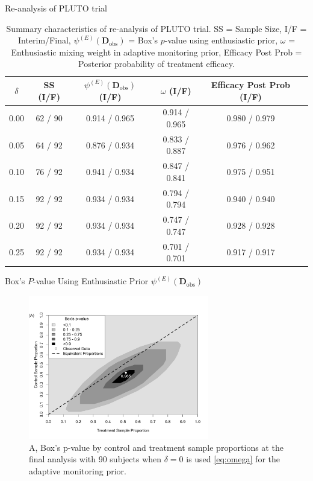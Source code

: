 \documentclass{beamer}
\begin{document}
\begin{frame}{Re-analysis of PLUTO trial}
\footnotesize
\begin{table}[htbp]\label{tbl:real-pluto}%
\centering
\caption{Summary characteristics of re-analysis of PLUTO trial. SS = Sample Size, I/F = Interim/Final, $\psi^{(E)}(\mathbf{D}_{\text{obs}})$ = Box's $p$-value using enthusiastic prior, $\omega$ = Enthusiastic mixing weight in adaptive monitoring prior, Efficacy Post Prob = Posterior probability of treatment efficacy.}%
\begin{tabular*}{300pt}{@{\extracolsep\fill}cccccc@{\extracolsep\fill}}%
\toprule
$\delta$	&	SS (I/F)			&	$\psi^{(E)}(\mathbf{D}_{\text{obs}})$ (I/F)			&	$\omega$ (I/F)			&	Efficacy Post Prob (I/F)			\\
\midrule
0.00	&	62	/	90	&	0.914	/	0.965	&	0.914	/	0.965	&	0.980	/	0.979	\\
0.05	&	64	/	92	&	0.876	/	0.934	&	0.833	/	0.887	&	0.976	/	0.962	\\
0.10	&	76	/	92	&	0.941	/	0.934	&	0.847	/	0.841	&	0.975	/	0.951	\\
0.15	&	92	/	92	&	0.934	/	0.934	&	0.794	/	0.794	&	0.940	/	0.940	\\
0.20	&	92	/	92	&	0.934	/	0.934	&	0.747	/	0.747	&	0.928	/	0.928	\\
0.25	&	92	/	92	&	0.934	/	0.934	&	0.701	/	0.701	&	0.917	/	0.917	\\
\bottomrule
\end{tabular*}
\end{table}
\end{frame}

\begin{frame}{Box's $P$-value Using Enthusiastic Prior $\psi^{(E)}(\mathbf{D}_{\text{obs}})$ }
\begin{figure}[htbp]
\begin{center}
\includegraphics[width=0.7\textwidth]{./figures/2dbayesp.png}
    \caption{A, Box's p-value by control and treatment sample proportions at the final analysis with 90 subjects when $\delta=0$ is used \eqref{eq:omega} for the adaptive monitoring prior.}
\label{fig:2dheatmaps}
 \end{center}
\end{figure}
\end{frame}
\end{document}
